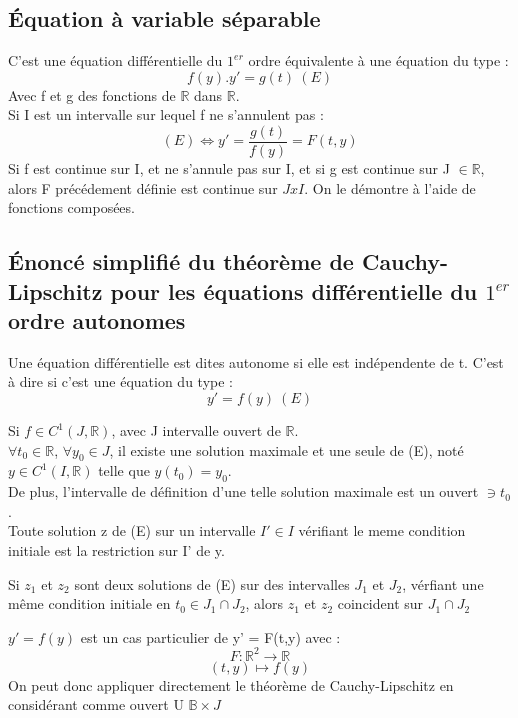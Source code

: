 \subsection{Équation à variable séparable}
\begin{de}
C'est une équation différentielle du $1^{er}$ ordre équivalente à une équation du type :
$$f(y).y' = g(t)~ (E)$$
Avec f et g des fonctions de $\mathbb{R}$ dans $\mathbb{R}$.\\
Si I est un intervalle sur lequel f ne s'annulent pas :
$$(E) \Leftrightarrow y' = \dfrac{g(t)}{f(y)} = F(t,y)$$
Si f est continue sur I, et ne s'annule pas sur I, et si g est continue sur J $\in \mathbb{R}$, alors F précédement définie est continue sur $JxI$. On le démontre à l'aide de fonctions composées.
\end{de}
\subsection{Énoncé simplifié du théorème de Cauchy-Lipschitz pour les équations différentielle du $1^{er}$ ordre autonomes}
\begin{de}
Une équation différentielle est dites autonome si elle est indépendente de t. C'est à dire si c'est une équation du type : 
$$y' = f(y)~ (E)$$
\end{de}
Si $f \in C^1(J,\mathbb{R})$, avec J intervalle ouvert de $\mathbb{R}$.\\
$\forall t_0 \in \mathbb{R}$, $\forall y_0 \in J$, il existe une solution maximale et une seule de (E), noté $y \in C^1(I,\mathbb{R})$ telle que $y(t_0)=y_0$.\\
De plus, l'intervalle de définition d'une telle solution maximale est un ouvert $\ni t_0$.\\
Toute solution z de (E) sur un intervalle $I' \in I$ vérifiant le meme condition initiale est la restriction sur I' de y.\\
\begin{coro}
Si $z_1$ et $z_2$ sont deux solutions de (E) sur des intervalles $J_1$ et $J_2$, vérfiant une même condition initiale en $t_0 \in J_1 \cap J_2$, alors $z_1$ et $z_2$ coincident sur $J_1 \cap J_2$
\end{coro}
$y' = f(y)$ est un cas particulier de y' = F(t,y) avec :
$$F : \mathbb{R}^2 \rightarrow \mathbb{R}$$
$$(t,y) \mapsto f(y)$$
On peut donc appliquer directement le théorème de Cauchy-Lipschitz en considérant comme ouvert U $\mathbb{B}\times J$
